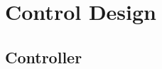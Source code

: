 \part{Control Design}
\label{control_design}

\chapter{Controller}
\label{Controller}























	